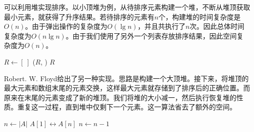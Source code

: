 \documentclass[b5paper]{ctexart}
\begin{document}
可以利用堆实现排序。以小顶堆为例，从待排序元素构建一个堆，不断从堆顶获取最小元素，就获得了升序结果。若待排序的元素有$n$个，构建堆的时间复杂度是$O(n)$。由于弹出操作的复杂度为$O(\lg n)$，并且共执行了$n$次。因此总体时间复杂度为$O(n \lg n)$。由于我们使用了另外一个列表存放排序结果，因此空间复杂度为$O(n)$。

\begin{algorithmic}[1]
  \State $R \gets [\ ]$
  \State {}
    \State {}($R$, )
  \EndWhile
  \State \Return $R$
\EndFunction
\end{algorithmic}

Robert. W. Floyd给出了另一种实现。思路是构建一个大顶堆。接下来，将堆顶的最大元素和数组末尾的元素交换，这样最大元素就存储到了排序后的正确位置。而原来在末尾的元素变成了新的堆顶。我们将堆的大小减一，然后执行恢复堆的性质。重复这一过程，直到堆中仅剩下一个元素。这一算法省去了额外的空间。

\begin{algorithmic}[1]
  \State {}
  \State $n \gets |A|$
    \State {} $A[1] \leftrightarrow A[n]$
    \State $n \gets n - 1$
    \State {}
  \EndWhile
\EndFunction
\end{algorithmic}

\begin{Exercise}\label{ex:arrayed-binary-heap}

\end{Exercise}
\end{document}
